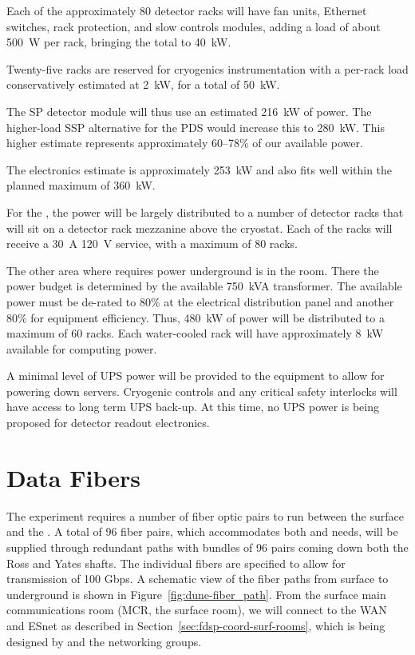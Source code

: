 Each of the approximately 80 detector racks will have fan units,
Ethernet switches, rack protection, and slow controls modules, adding
a load of about 500~W per rack, bringing the total to 40~kW.

Twenty-five racks are reserved for cryogenics instrumentation with a
per-rack load conservatively estimated at 2~kW, for a total of 50~kW.

The SP detector module will thus use an estimated 216~kW of power. The
higher-load SSP alternative for the PDS would increase this to
280~kW. This higher estimate represents approximately 60--78\% of
our available power.

The  electronics estimate is
approximately 253~kW and also fits well within the planned maximum of
360~kW.

For the , the power will be largely distributed to a number
of detector racks that will sit on a detector rack mezzanine above
the cryostat.  Each of the racks will receive a \SI{30}{A} \SI{120}{V} 
service, with a maximum of 80 racks.

The other area where  requires power underground is in the 
room.  There the power budget is determined by the available 750~kVA
transformer.  The available power must be de-rated to 80\% at
the electrical distribution panel and another 80\% for equipment
efficiency.  Thus, 480~kW of power will be distributed to a maximum of
60 racks.  Each water-cooled rack will have approximately 8~kW
available for computing power.

A minimal level of UPS power will be provided to the  equipment to
allow for powering down servers.  Cryogenic controls and any
critical safety interlocks will have access to long term UPS back-up.
At this time, no UPS power is being proposed for detector readout
electronics.


\section{Data Fibers}
\label{sec:fdsp-coord-faci-fibers}


The  experiment requires a number of fiber optic pairs to
run between the surface and the .  A total of 96 fiber
pairs, which accommodates both  and  needs, will
be supplied through redundant paths with bundles of 96 pairs coming
down both the Ross and Yates shafts.  The individual fibers are
specified to allow for transmission of 100 Gbps.  A schematic view of
the fiber paths from surface to underground is shown in
Figure~\ref{fig:dune-fiber_path}. From the surface main communications room (MCR, the surface 
room), we will connect to the WAN and ESnet as described in
Section~\ref{sec:fdsp-coord-surf-rooms}, which is being designed by
 and the  networking groups.

